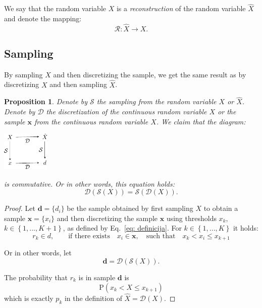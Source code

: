 \documentclass[10pt]{article}
\newtheorem{prop}{Proposition}
\renewcommand{\vec}[1]{\mathbf{#1}}
\begin{document}
We say that the random variable $X$ is a {\it reconstruction} of the random variable $\hat{X}$ and denote the mapping:
\begin{equation}
\mathcal{R}: \hat{X} \rightarrow X.
\end{equation}


\subsection{Sampling}
By sampling $X$ and then discretizing the sample, we get the same result as by discretizing $X$ and then sampling $\hat{X}$.

\begin{prop} \label{thm: sampling}
Denote by $\mathcal{S}$ the sampling from the random variable $X$ or $\hat{X}$. Denote by $\mathcal{D}$ the discretization of the continuous random variable $X$ or the sample $\vec{x}$ from the continuous random variable $X$. We claim that the diagram:

\begin{center}
\includegraphics[width=0.17\textwidth]{diagram-cropped.pdf}
\end{center}

is commutative. Or in other words, this equation holds:
$$
\mathcal{D}(\mathcal{S}(X)) = \mathcal{S}(\mathcal{D}(X)).
$$
\end{prop}

\begin{proof}
Let $\vec{d} = \lbrace d_{i} \rbrace$ be the sample obtained by first sampling $X$ to obtain a sample $\vec{x} = \lbrace x_{i} \rbrace$ and then discretizing the sample $\vec{x}$ using thresholds $x_{k}$, $k \in \left\lbrace 1, ..., K+1 \right\rbrace$, as defined by Eq.~\ref{eq: definicija}. For $ k \in \left\lbrace 1, ..., K\right\rbrace$ it holds:
\begin{equation}
r_{k} \in d, \qquad \text{if there exists} \quad x_{i} \in \vec{x}, \quad \text{such that} \quad x_{k} < x_{i} \leq x_{k + 1}
\end{equation}

Or in other words, let
$$
\vec{d} = \mathcal{D}(\mathcal{S}(X)).
$$

The probability that $r_{k}$ is in sample $\vec{d}$ is 
$$
\mathrm{P}(x_{k} < X \leq x_{k+1})
$$
which is exactly $p_{k}$ in the definition of $\hat{X} = \mathcal{D}(X)$.
\end{proof}
\end{document}
